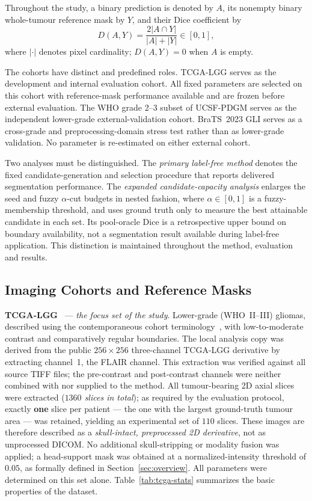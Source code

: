 \documentclass[11pt,a4paper]{article}
\begin{document}
Throughout the study, a binary prediction is denoted by $A$, its nonempty binary
whole-tumour reference mask by $Y$, and their Dice coefficient by
\begin{equation}
 D(A,Y)=\frac{2|A\cap Y|}{|A|+|Y|}\in[0,1],
 \label{eq:dice-definition}
\end{equation}
where $|\cdot|$ denotes pixel cardinality; $D(A,Y)=0$ when $A$ is empty.

The cohorts have distinct and predefined roles. TCGA-LGG serves as the development and
internal evaluation cohort. All fixed parameters are selected on this cohort
with reference-mask performance available and are frozen before external
evaluation. The WHO grade 2--3 subset of UCSF-PDGM serves as the independent
lower-grade external-validation cohort. BraTS~2023 GLI serves as a cross-grade
and preprocessing-domain stress test rather than as lower-grade validation. No
parameter is re-estimated on either external cohort.

Two analyses must be distinguished. The \emph{primary label-free method} denotes
the fixed candidate-generation and selection procedure that reports delivered
segmentation performance. The \emph{expanded candidate-capacity analysis}
enlarges the seed and fuzzy $\alpha$-cut budgets in nested fashion, where
$\alpha\in[0,1]$ is a fuzzy-membership threshold, and uses ground
truth only to measure the best attainable candidate in each set. Its pool-oracle
Dice is a retrospective upper bound on boundary availability, not a segmentation
result available during label-free application. This distinction is maintained
throughout the method, evaluation and results.

\subsection{Imaging Cohorts and Reference Masks}\label{sec:data}

\textbf{TCGA-LGG}~\cite{buda2019} --- \emph{the focus set of the study}.
Lower-grade (WHO~II--III) gliomas, described using the contemporaneous cohort
terminology~\cite{louis2021}, with low-to-moderate contrast and comparatively
regular boundaries. The local analysis copy was derived from the public
$256\times256$ three-channel TCGA-LGG derivative by extracting channel~1, the
FLAIR channel. This extraction was verified against all source TIFF files; the
pre-contrast and post-contrast channels were neither combined with nor supplied
to the method. All tumour-bearing 2D axial slices
were extracted (\emph{$1360$ slices in total}); as required by the
evaluation protocol, exactly \textbf{one} slice per patient --- the one with the
largest ground-truth tumour area --- was retained, yielding an experimental set
of $110$ slices. These images are therefore described as a \emph{skull-intact,
preprocessed 2D derivative}, not as unprocessed DICOM. No additional
skull-stripping or modality fusion was applied; a head-support mask was obtained
at a normalized-intensity threshold of $0.05$, as formally defined in
Section~\ref{sec:overview}. All parameters were determined on this set alone.
Table~\ref{tab:tcga-stats} summarizes the basic properties of the dataset.
\end{document}
